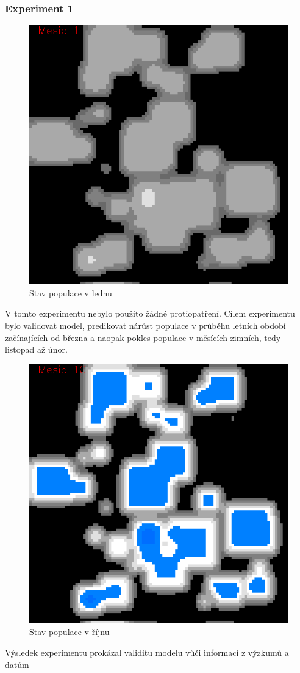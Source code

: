 \documentclass[a4paper,11pt]{article}
\begin{document}
\subsubsection{Experiment 1}
\begin{figure}[h]
\begin{center}  
    \includegraphics[width=.4\linewidth]{bez_regul1.png}
    \caption{Stav populace v lednu}
    \label{pic:exp1_obr1}
\end{center}
\end{figure}

V tomto experimentu nebylo použito žádné protiopatření. Cílem experimentu bylo validovat model, predikovat nárůst populace v průběhu letních období začínajících od března a naopak pokles populace v měsících zimních, tedy listopad až únor. 

\begin{figure}[h]
\begin{center}
    \includegraphics[width=.4\linewidth]{bez_regul10.png}
    \caption{Stav populace v říjnu}
    \label{pic:exp1_obr2}
\end{center}
\end{figure}

Výsledek experimentu prokázal validitu modelu vůči informací z výzkumů \cite{fluktuace} a datům \cite{Voles-popul-data:online}
\end{document}
